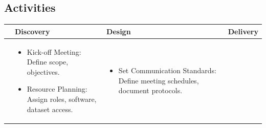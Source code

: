 \documentclass[mstat,12pt]{unswthesis}
\begin{document}
\hypertarget{activities}{\subsection{Activities}\label{activities}}
\begin{landscape}
\begin{tabularx}{\linewidth}{@{} M{0.5cm} Y Y Y @{}}
\toprule
& \textbf{Discovery} & \textbf{Design} & \textbf{Delivery} \\
\midrule
{} &
\begin{itemize}[leftmargin=*, nosep, after=\vspace{-1ex}, before=\vspace{-2.5ex}]
    \item Kick-off Meeting: Define scope, objectives.
    \item Resource Planning: Assign roles, software, dataset access.
\end{itemize} & 
\begin{itemize}[leftmargin=*, nosep, after=\vspace{-1.5ex}, before=\vspace{-2.5ex}]
    \item Set Communication Standards: Define meeting schedules, document protocols.


\end{itemize}
\end{tabularx}
\end{landscape}
\end{document}
